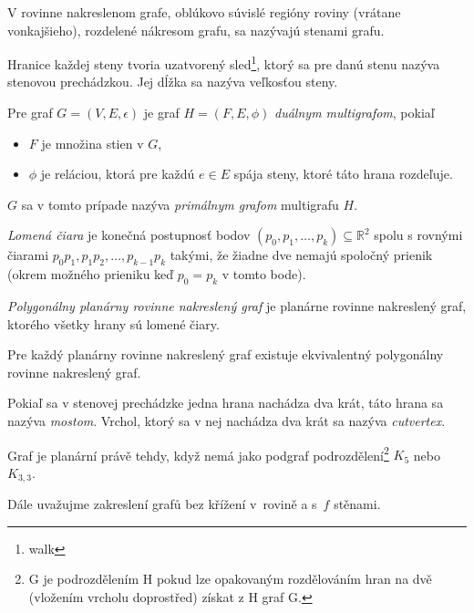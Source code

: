 \begin{definition}[Stena]
	V rovinne nakreslenom grafe, oblúkovo súvislé regióny roviny (vrátane vonkajšieho),
	rozdelené nákresom grafu, sa nazývajú stenami grafu.
	
	Hranice každej steny tvoria uzatvorený sled\footnote{walk}, ktorý sa pre
	danú stenu nazýva stenovou prechádzkou. Jej dĺžka sa nazýva veľkosťou steny.
\end{definition}

\begin{definition}
	Pre graf $G=(V,E,\epsilon)$ je graf $H=(F,E,\phi)$ {\em duálnym multigrafom}, pokiaľ
	\begin{itemize}
		\item $F$ je množina stien v $G$,
		\item $\phi$ je reláciou, ktorá pre každú $e \in E$ spája steny, ktoré táto hrana rozdeľuje.
	\end{itemize}
	$G$ sa v tomto prípade nazýva {\em primálnym grafom} multigrafu $H$.
\end{definition}

\begin{definition}
	{\em Lomená čiara} je konečná postupnosť bodov $(p_0, p_1, \ldots,
	p_k) \subseteq \mathbb{R}^2$ spolu s rovnými čiarami $p_0p_1, p_1p_2, 
	\ldots, p_{k-1}p_k$ takými, že žiadne dve nemajú spoločný prienik
	(okrem možného prieniku keď $p_0=p_k$ v tomto bode).
	
	{\em Polygonálny planárny rovinne nakreslený graf} je planárne rovinne
	nakreslený graf, ktorého všetky hrany sú lomené čiary.
\end{definition}

Pre každý planárny rovinne nakreslený graf existuje ekvivalentný polygonálny
rovinne nakreslený graf.

Pokiaľ sa v stenovej prechádzke jedna hrana nachádza dva krát, táto hrana
sa nazýva {\em mostom}. Vrchol, ktorý sa v nej nachádza dva krát sa nazýva
{\em cutvertex}.

\begin{theorem}[Kuratowski]
Graf je planární právě tehdy, když nemá jako podgraf
podrozdělení\footnote{G je podrozdělením H pokud lze opakovaným
rozdělováním hran na dvě (vložením vrcholu doprostřed) získat z H graf
G.} $K_5$ nebo $K_{3,3}$.
\end{theorem}

Dále uvažujme zakreslení grafů bez křížení v~rovině a s~$f$
stěnami.


